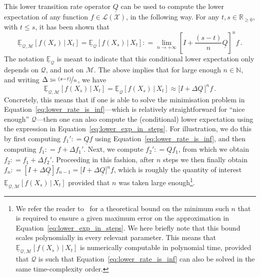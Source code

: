 \documentclass[twoside,11pt]{article}
\newcommand{\nats}{\mathbb{N}}
\newcommand{\reals}{\mathbb{R}}
\newcommand{\realsnonneg}{\reals_{\geq 0}}
\newcommand{\states}{\mathcal{X}}
\newcommand{\lexp}{\underline{\mathbb{E}}_{\rateset,\mathcal{M}}}
\newcommand{\gambles}{\mathcal{L}}
\newcommand{\gamblesX}{\gambles(\states)}
\newcommand{\rateset}{\mathcal{Q}}
\newcommand{\lrate}{\underline{Q}}
\newcommand{\coloneqq}{:\!=}
\begin{document}
This lower transition rate operator $\lrate$ can be used to compute the lower expectation of any function $f\in\gamblesX$, in the following way. For any $t,s\in\realsnonneg$, with $t\leq s$, it has been shown that
\begin{equation*}
\lexp[f(X_s)\,\vert\,X_t] = \underline{\mathbb{E}}_\rateset[f(X_s)\,\vert\,X_t] \coloneqq \lim_{n\to+\infty}\left[I+\frac{(s-t)}{n}\lrate\right]^n f\,.
\end{equation*}
The notation $\underline{\mathbb{E}}_\rateset$ is meant to indicate that this conditional lower expectation only depends on $\rateset$, and not on $\mathcal{M}$. The above implies that for large enough $n\in\nats$, and writing $\Delta\coloneqq \nicefrac{(s-t)}{n}$, we have
\begin{equation}\label{eq:lower_exp_in_steps}
\lexp[f(X_s)\,\vert\,X_t] = \underline{\mathbb{E}}_\rateset[f(X_s)\,\vert\,X_t] \approx \bigl[I + \Delta\lrate\,\bigr]^nf\,.
\end{equation}
Concretely, this means that if one is able to solve the minimisation problem in Equation~\eqref{eq:lower_rate_is_inf}---which is relatively straightforward for ``nice enough'' $\rateset$---then one can also compute the (conditional) lower expectation using the expression in Equation~\ref{eq:lower_exp_in_steps}. For illustration, we do this by first computing $f_1'\coloneqq \lrate f$ using Equation~\eqref{eq:lower_rate_is_inf}, and then computing $f_1\coloneqq f + \Delta f_1'$. Next, we compute $f_2'\coloneqq \lrate f_1$, from which we obtain $f_2\coloneqq f_1 + \Delta f_2'$. Proceeding in this fashion, after $n$ steps we then finally obtain $f_n \coloneqq [I+\Delta\lrate]f_{n-1} = \bigl[I+\Delta\lrate\bigr]^nf$, which is roughly the quantity of interest $\underline{\mathbb{E}}_{\rateset,\mathcal{M}}[f(X_s)\,\vert\,X_t]$ provided that $n$ was taken large enough\footnote{We refer the reader to~\citep[Proposition 8.5]{krak2016ictmc} for a theoretical bound on the minimum such $n$ that is required to ensure a given maximum error on the approximation in Equation~\eqref{eq:lower_exp_in_steps}. We here briefly note that this bound scales polynomially in every relevant parameter. This means that $\lexp[f(X_s)\,\vert\,X_t]$ is numerically computable in polynomial time, provided that $\rateset$ is such that Equation~\eqref{eq:lower_rate_is_inf} can also be solved in the same time-complexity order.}.
\end{document}
